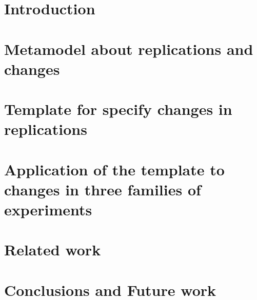 \documentclass[runningheads]{llncs}
\begin{document}
\section{Introduction}
\label{sec:intro}


%

%
\section{Metamodel about replications and changes}
\label{sec:metamodelo}


\section{Template for specify changes in replications}
\label{sec:plantilla}


\section{Application of the template to changes in three families of experiments}
\label{sec:aplica}

%
%

\section{Related work}
\label{sec:trabajos}


\section{Conclusions and Future work}
\label{sec:conclusions}

\end{document}
